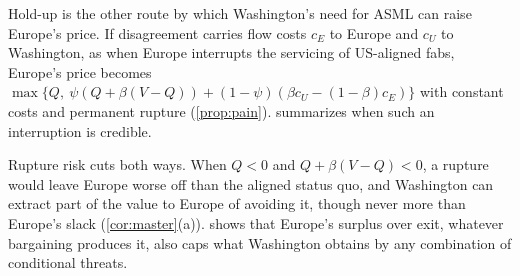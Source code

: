 Hold-up is the other route by which Washington's need for ASML can raise Europe's price. If disagreement carries flow costs $c_E$ to Europe and $c_U$ to Washington, as when Europe interrupts the servicing of US-aligned fabs, Europe's price becomes $\max\{Q,\ \psi(Q+\beta(V-Q))+(1-\psi)(\beta c_U-(1-\beta)c_E)\}$ with constant costs and permanent rupture (\cref{prop:pain}).  summarizes when such an interruption is credible.

Rupture risk cuts both ways. When $Q<0$ and $Q+\beta(V-Q)<0$, a rupture would leave Europe worse off than the aligned status quo, and Washington can extract part of the value to Europe of avoiding it, though never more than Europe's slack (\cref{cor:master}(a)).  shows that Europe's surplus over exit, whatever bargaining produces it, also caps what Washington obtains by any combination of conditional threats.
